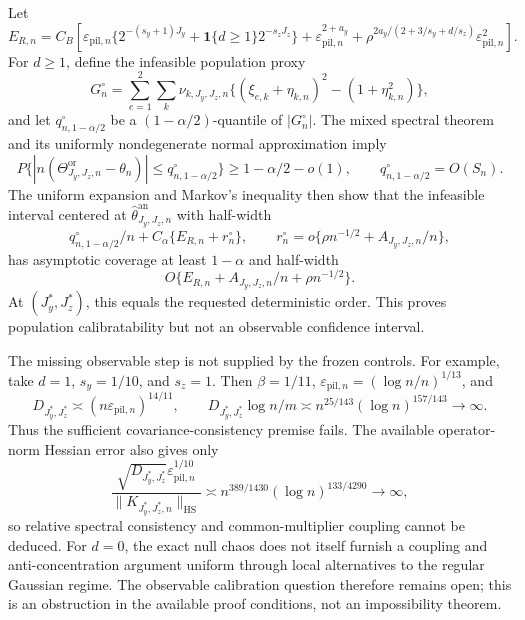 Let
\[
E_{R,n}=C_B\left[
\varepsilon_{\mathrm{pil},n}\{2^{-(s_y+1)J_y}+\mathbf1\{d\ge1\}2^{-s_zJ_z}\}
+\varepsilon_{\mathrm{pil},n}^{2+a_y}
+\rho^{2a_y/(2+3/s_y+d/s_z)}\varepsilon_{\mathrm{pil},n}^2
\right].
\]
For \(d\ge1\), define the infeasible population proxy
\[
G_n^\circ=\sum_{e=1}^2\sum_k\nu_{k,J_y,J_z,n}
\{(\xi_{e,k}+\eta_{k,n})^2-(1+\eta_{k,n}^2)\},
\]
and let \(q_{n,1-\alpha/2}^\circ\) be a \((1-\alpha/2)\)-quantile of \(|G_n^\circ|\).  The mixed spectral theorem and its uniformly nondegenerate normal approximation imply
\[
P\{|n(\Theta^{\mathrm{or}}_{J_y,J_z,n}-\theta_n)|
\le q_{n,1-\alpha/2}^\circ\}\ge1-\alpha/2-o(1),
\qquad q_{n,1-\alpha/2}^\circ=O(S_n).
\]
The uniform expansion and Markov's inequality then show that the infeasible interval centered at \(\widehat\theta^{\mathrm{an}}_{J_y,J_z,n}\) with half-width
\[
q_{n,1-\alpha/2}^\circ/n+C_\alpha\{E_{R,n}+r_n^\circ\},
\qquad
r_n^\circ=o\{\rho n^{-1/2}+A_{J_y,J_z,n}/n\},
\]
has asymptotic coverage at least \(1-\alpha\) and half-width
\[
O\{E_{R,n}+A_{J_y,J_z,n}/n+\rho n^{-1/2}\}.
\]
At \((J_y^*,J_z^*)\), this equals the requested deterministic order.  This proves population calibratability but not an observable confidence interval.

The missing observable step is not supplied by the frozen controls.  For example, take \(d=1\), \(s_y=1/10\), and \(s_z=1\).  Then \(\beta=1/11\), \(\varepsilon_{\mathrm{pil},n}=(\log n/n)^{1/13}\), and
\[
D_{J_y^*,J_z^*}\asymp(n\varepsilon_{\mathrm{pil},n})^{14/11},
\qquad
D_{J_y^*,J_z^*}\log n/m
\asymp n^{25/143}(\log n)^{157/143}\to\infty.
\]
Thus the sufficient covariance-consistency premise fails.  The available operator-norm Hessian error also gives only
\[
\frac{\sqrt{D_{J_y^*,J_z^*}}\varepsilon_{\mathrm{pil},n}^{1/10}}
{\|K_{J_y^*,J_z^*,n}\|_{\mathrm{HS}}}
\asymp n^{389/1430}(\log n)^{133/4290}\to\infty,
\]
so relative spectral consistency and common-multiplier coupling cannot be deduced.  For \(d=0\), the exact null chaos does not itself furnish a coupling and anti-concentration argument uniform through local alternatives to the regular Gaussian regime.  The observable calibration question therefore remains open; this is an obstruction in the available proof conditions, not an impossibility theorem.